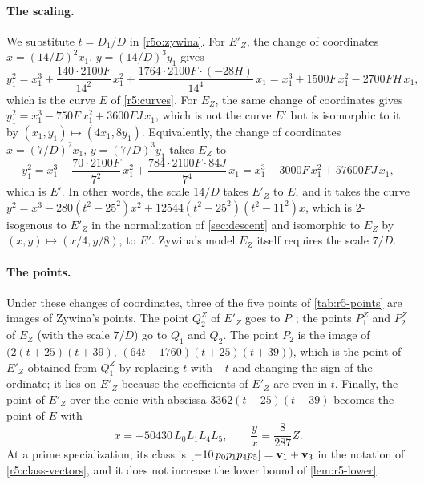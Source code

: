 \paragraph{The scaling.} We substitute $t=D_1/D$ in \eqref{r5o:zywina}. For $E'_Z$, the change of coordinates $x=(14/D)^2x_1$, $y=(14/D)^3y_1$ gives
\[
y_1^2=x_1^3+\frac{140\cdot2100F}{14^2}\,x_1^2+\frac{1764\cdot2100F\cdot(-28H)}{14^4}\,x_1=x_1^3+1500F\,x_1^2-2700FH\,x_1,
\]
which is the curve $E$ of \eqref{r5:curves}. For $E_Z$, the same change of coordinates gives $y_1^2=x_1^3-750F\,x_1^2+3600FJ\,x_1$, which is not the curve $E'$ but is isomorphic to it by $(x_1,y_1)\mapsto(4x_1,8y_1)$. Equivalently, the change of coordinates $x=(7/D)^2x_1$, $y=(7/D)^3y_1$ takes $E_Z$ to
\[
y_1^2=x_1^3-\frac{70\cdot2100F}{7^2}\,x_1^2+\frac{784\cdot2100F\cdot84J}{7^4}\,x_1=x_1^3-3000F\,x_1^2+57600FJ\,x_1,
\]
which is $E'$. In other words, the scale $14/D$ takes $E'_Z$ to $E$, and it takes the curve $y^2=x^3-280(t^2-25^2)x^2+12544(t^2-25^2)(t^2-11^2)x$, which is $2$-isogenous to $E'_Z$ in the normalization of \cref{sec:descent} and isomorphic to $E_Z$ by $(x,y)\mapsto(x/4,y/8)$, to $E'$. Zywina's model $E_Z$ itself requires the scale $7/D$.

\paragraph{The points.} Under these changes of coordinates, three of the five points of \cref{tab:r5-points} are images of Zywina's points. The point $Q^Z_2$ of $E'_Z$ goes to $P_1$; the points $P^Z_1$ and $P^Z_2$ of $E_Z$ (with the scale $7/D$) go to $Q_1$ and $Q_2$. The point $P_2$ is the image of $\big(2(t+25)(t+39),\,(64t-1760)(t+25)(t+39)\big)$, which is the point of $E'_Z$ obtained from $Q^Z_1$ by replacing $t$ with $-t$ and changing the sign of the ordinate; it lies on $E'_Z$ because the coefficients of $E'_Z$ are even in $t$. Finally, the point of $E'_Z$ over the conic with abscissa $3362(t-25)(t-39)$ becomes the point of $E$ with
\[
x=-50430\,L_0L_1L_4L_5,\qquad \frac yx=\frac8{287}Z.
\]
At a prime specialization, its class is $[-10\,p_0p_1p_4p_5]=\mathbf v_1+\mathbf v_3$ in the notation of \eqref{r5:class-vectors}, and it does not increase the lower bound of \cref{lem:r5-lower}.

